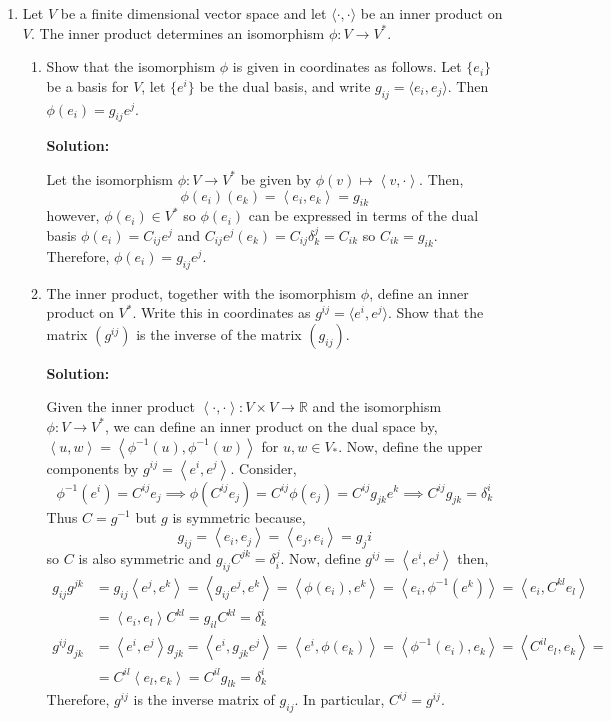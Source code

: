 \documentclass[12pt]{extarticle}
\newcommand{\R}{\mathbb{R}}
\begin{document}
\begin{enumerate}
\vfill
\eject

\item Let $V$ be a finite dimensional vector space and let $\langle\cdot,\cdot\rangle$ be an inner product on $V$. The inner product determines an isomorphism $\phi: V\to V^*$. 
\begin{enumerate}
\item
Show that the isomorphism $\phi$ is given in coordinates as follows. Let $\{e_i\}$ be a basis for $V$, let $\{e^i\}$ be the dual basis, and write $g_{ij}=\langle e_i,e_j\rangle$. Then $\phi(e_i)=g_{ij}e^j$. 

\textbf{Solution:}

Let the isomorphism $\phi : V \to V^*$ be given by $\phi(v) \mapsto \left<v, \cdot \right>$. Then, 
\[\phi(e_i) (e_k) = \left<e_i, e_k \right> = g_{ik}\]
however, $\phi(e_i) \in V^*$ so $\phi(e_i)$ can be expressed in terms of the dual basis $\phi(e_i) = C_{ij} e^j$ and $C_{ij} e^j(e_k) = C_{ij} \delta^j_k = C_{ik}$ so $C_{ik} = g_{ik}$. Therefore, $\phi(e_i) = g_{ij} e^j$.  

\item
The inner product, together with the isomorphism $\phi$, define an inner product on $V^*$. Write this in coordinates as $g^{ij}=\langle e^i,e^j\rangle$. Show that the matrix $(g^{ij})$ is the inverse of the matrix $(g_{ij})$.

\textbf{Solution:}

Given the inner product $\left< \cdot, \cdot \right> : V \times V \to \R$ and the isomorphism $\phi : V \to V^*$, we can define an inner product on the dual space by, $\left< u, w \right> = \left< \phi^{-1}(u), \phi^{-1}(w) \right>$ for $u, w \in V_*$. Now, define the upper components by $g^{ij} = \left<e^i, e^j\right>$. Consider, 
\[\phi^{-1}(e^i) = C^{ij} e_j \implies \phi(C^{ij} e_j) = C^{ij} \phi(e_j) = C^{ij} g_{jk} e^k \implies C^{ij} g_{jk} = \delta^i_k\]
Thus $C = g^{-1}$ but $g$ is symmetric because,
\[ g_{ij} = \left<e_i, e_j \right> = \left<e_j, e_i \right> = g_ji\]
so $C$ is also symmetric and $g_{ij} C^{jk} = \delta_i^j$. 
Now, define $g^{ij} = \left< e^i, e^j \right>$ then,
\begin{align*}
g_{ij} g^{jk} & = g_{ij} \left< e^j, e^k \right> = \left< g_{ij} e^j, e^k \right> = \left< \phi(e_i), e^k \right> = \left< e_i, \phi^{-1}(e^k) \right> = \left< e_i, C^{k l}e_l \right> 
\\
& = \left< e_i, e_l \right> C^{k l} = g_{il} C^{kl} = \delta^i_k
\\
g^{ij} g_{jk} & = \left< e^i, e^j \right> g_{jk} = \left< e^i, g_{jk} e^j \right> = \left< e^i, \phi(e_k) \right> = \left< \phi^{-1}(e_i), e_k \right> = \left< C^{i l} e_l, e_k \right> = 
\\
& = C^{i l} \left< e_l, e_k \right>= C^{il} g_{lk} = \delta^i_k
\end{align*}
Therefore, $g^{ij}$ is the inverse matrix of $g_{ij}$. In particular, $C^{ij} = g^{ij}$.


\end{enumerate}
\end{enumerate}
\end{document}
